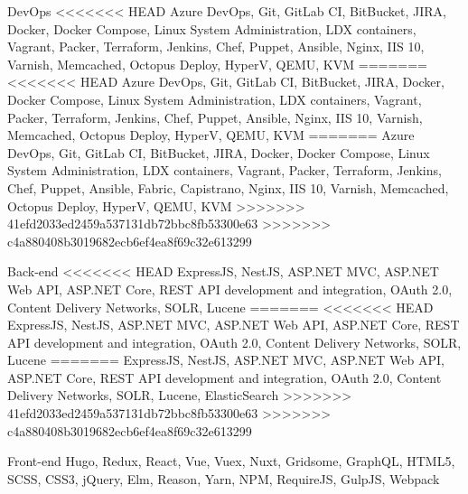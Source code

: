 

\begin{cvskills}

  \cvskill
    {DevOps} %
<<<<<<< HEAD
    {Azure DevOps, Git, GitLab CI, BitBucket, JIRA, Docker, Docker Compose, Linux System Administration, LDX containers, Vagrant, Packer, Terraform, Jenkins, Chef, Puppet, Ansible, Nginx, IIS 10, Varnish, Memcached, Octopus Deploy, HyperV, QEMU, KVM} %
=======
<<<<<<< HEAD
    {Azure DevOps, Git, GitLab CI, BitBucket, JIRA, Docker, Docker Compose, Linux System Administration, LDX containers, Vagrant, Packer, Terraform, Jenkins, Chef, Puppet, Ansible, Nginx, IIS 10, Varnish, Memcached, Octopus Deploy, HyperV, QEMU, KVM} %
=======
    {Azure DevOps, Git, GitLab CI, BitBucket, JIRA, Docker, Docker Compose, Linux System Administration, LDX containers, Vagrant, Packer, Terraform, Jenkins, Chef, Puppet, Ansible, Fabric, Capistrano, Nginx, IIS 10, Varnish, Memcached, Octopus Deploy, HyperV, QEMU, KVM} %
>>>>>>> 41efd2033ed2459a537131db72bbc8fb53300e63
>>>>>>> c4a880408b3019682ecb6ef4ea8f69c32e613299

  \cvskill
    {Back-end} %
<<<<<<< HEAD
    {ExpressJS, NestJS, ASP.NET MVC, ASP.NET Web API, ASP.NET Core, REST API development and integration, OAuth 2.0, Content Delivery Networks, SOLR, Lucene} %
=======
<<<<<<< HEAD
    {ExpressJS, NestJS, ASP.NET MVC, ASP.NET Web API, ASP.NET Core, REST API development and integration, OAuth 2.0, Content Delivery Networks, SOLR, Lucene} %
=======
    {ExpressJS, NestJS, ASP.NET MVC, ASP.NET Web API, ASP.NET Core, REST API development and integration, OAuth 2.0, Content Delivery Networks, SOLR, Lucene, ElasticSearch} %
>>>>>>> 41efd2033ed2459a537131db72bbc8fb53300e63
>>>>>>> c4a880408b3019682ecb6ef4ea8f69c32e613299

  \cvskill
    {Front-end} %
    {Hugo, Redux, React, Vue, Vuex, Nuxt, Gridsome, GraphQL, HTML5, SCSS, CSS3, jQuery, Elm, Reason, Yarn, NPM, RequireJS, GulpJS, Webpack} %


\end{cvskills}

